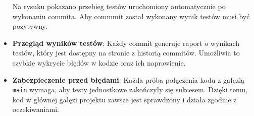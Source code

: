 \begin{itemize}
        Na rysuku  pokazano przebieg testów uruchomiony automatycznie po wykonaniu commita.
        Aby commmit został wykonany wynik testów musi być pozytywny.

  \item \textbf{Przegląd wyników testów}: Każdy commit generuje raport o wynikach testów, który jest dostępny na stronie z historią commitów. Umożliwia to szybkie wykrycie błędów w kodzie oraz ich naprawienie.
  \item \textbf{Zabezpieczenie przed błędami}: Każda próba połączenia kodu z gałęzią \texttt{main} wymaga, aby testy jednostkowe zakończyły się sukcesem. Dzięki temu, kod w głównej gałęzi projektu zawsze jest sprawdzony i działa zgodnie z oczekiwaniami.
\end{itemize}
